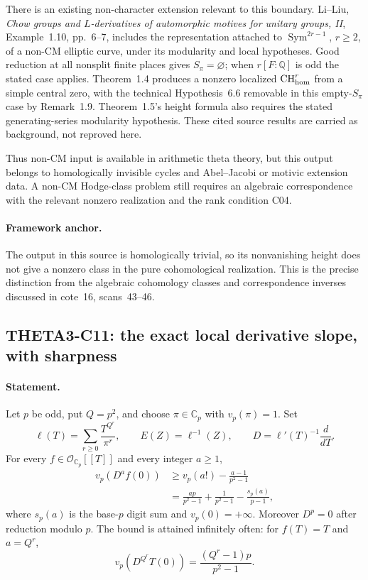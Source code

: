 \documentclass[11pt]{article}
\newcommand{\Q}{\mathbb Q}\newcommand{\C}{\mathbb C}\newcommand{\Z}{\mathbb Z}\newcommand{\R}{\mathbb R}\newcommand{\A}{\mathbb A}\newcommand{\OO}{\mathcal O}
\theoremstyle{definition}\newtheorem{definition}[theorem]{Definition}\newtheorem{remark}[theorem]{Remark}
\begin{document}
There is an existing non-character extension relevant to this
boundary. Li--Liu, \emph{Chow groups and $L$-derivatives of
automorphic motives for unitary groups, II}, Example~1.10,
pp.~6--7, includes the representation attached to
$\operatorname{Sym}^{2r-1}$, $r\geq2$, of a non-CM elliptic curve,
under its modularity and local hypotheses. Good reduction at all
nonsplit finite places gives $S_\pi=\varnothing$; when
$r[F:\Q]$ is odd the stated case applies. Theorem~1.4 produces a
nonzero localized $\operatorname{CH}^r_{\mathrm{hom}}$ from a simple central zero,
with the technical Hypothesis~6.6 removable in this empty-$S_\pi$
case by Remark~1.9. Theorem~1.5's height formula also requires the
stated generating-series modularity hypothesis. These cited source
results are carried as background, not reproved here.

Thus non-CM input is available in arithmetic theta theory, but this
output belongs to homologically invisible cycles and
Abel--Jacobi or motivic extension data. A non-CM Hodge-class problem
still requires an algebraic correspondence with the relevant
nonzero realization and the rank condition C04.

\paragraph{Framework anchor.}
The output in this source is homologically trivial, so its nonvanishing
height does not give a nonzero class in the pure cohomological realization.
This is the precise distinction from the algebraic cohomology classes
and correspondence inverses discussed in cote~16, scans~43--46.

\subsection{THETA3-C11: the exact local derivative slope, with sharpness}\label{C11}

\paragraph{Statement.}
Let $p$ be odd, put $Q=p^2$, and choose $\pi\in\C_p$ with
$v_p(\pi)=1$. Set
\[
 \ell(T)=\sum_{r\geq0}\frac{T^{Q^r}}{\pi^r},\qquad
 E(Z)=\ell^{-1}(Z),\qquad D=\ell'(T)^{-1}\frac{d}{dT}.
\]
For every $f\in\mathcal O_{\C_p}[[T]]$ and every integer $a\geq1$,
\begin{align*}
 v_p(D^af(0))
 &\geq v_p(a!)-\frac{a-1}{p^2-1}\\
 &=\frac{ap}{p^2-1}+\frac1{p^2-1}
                     -\frac{s_p(a)}{p-1},
\end{align*}
where $s_p(a)$ is the base-$p$ digit sum and $v_p(0)=+\infty$.
Moreover $D^p=0$ after reduction modulo $p$.
The bound is attained infinitely often: for $f(T)=T$ and $a=Q^r$,
\[
 v_p(D^{Q^r}T(0))=\frac{(Q^r-1)p}{p^2-1}.
\]
\end{document}
